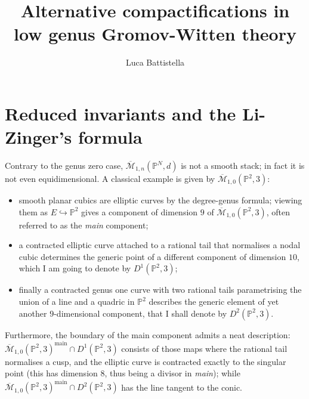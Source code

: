 \documentclass[11pt]{amsart}
\title[Thesis]{Alternative compactifications in low genus Gromov-Witten theory}
\author{Luca Battistella}
\newcommand{\M}[4]{\overline{\mathcal{M}}_{#1,#2}(#3,#4)}
\newcommand{\PP}{\mathbb P}
\theoremstyle{definition}
\theoremstyle{definition}
\begin{document}
\maketitle
\appendixtitletocoff
\tableofcontents

\section{Reduced invariants and the Li-Zinger's formula}
Contrary to the genus zero case, $\M{1}{n}{\PP^N}{d}$ is not a smooth stack; in fact it is not even equidimensional. A classical example is given by $\M{1}{0}{\PP^2}{3}$:
\begin{itemize}
 \item smooth planar cubics are elliptic curves by the degree-genus formula; viewing them as $E\hookrightarrow \PP^2$ gives a component of dimension $9$ of $\M{1}{0}{\PP^2}{3}$, often referred to as the \emph{main} component;
 \item a contracted elliptic curve attached to a rational tail that normalises a nodal cubic determines the generic point of a different component of dimension $10$, which I am going to denote by $D^1(\PP^2,3)$;
 \item finally a contracted genus one curve with two rational tails parametrising the union of a line and a quadric in $\PP^2$ describes the generic element of yet another $9$-dimensional component, that I shall denote by $D^2(\PP^2,3)$.
\end{itemize}
Furthermore, the boundary of the main component admits a neat description: $\M{1}{0}{\PP^2}{3}^{\mathrm{main}}\cap D^1(\PP^2,3)$ consists of those maps where the rational tail normalises a cusp, and the elliptic curve is contracted exactly to the singular point (this has dimension $8$, thus being a divisor in \emph{main}); while $\M{1}{0}{\PP^2}{3}^{\mathrm{main}}\cap D^2(\PP^2,3)$ has the line tangent to the conic.
\end{document}
